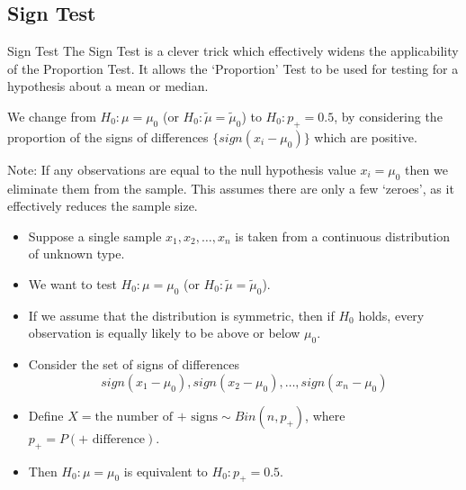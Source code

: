\documentclass[t,xcolor=pdftex,dvipsnames,table]{beamer}
\begin{document}
\subsection[Sign Test]{Sign Test}
\begin{frame}[fragile]{Sign Test}
The Sign Test is a clever trick which effectively widens the applicability of the Proportion Test. It allows the `Proportion' Test to be used for testing for a hypothesis about a mean or median.

\vspace{.5cm}
We change from $H_{0}: \mu = \mu_{0}$ (or $H_{0}: \tilde{\mu} = \tilde{\mu}_{0}$) to $H_{0}: p_{+} = 0.5$, by considering the proportion of the signs of differences $\{ sign(x_{i}-\mu_{0})\}$ which are positive.

\vspace{.5cm}
Note:
If any observations are equal to the null hypothesis value $x_{i} = \mu_{0}$ then we eliminate them from the sample. This assumes there are only a few `zeroes', as it effectively reduces the sample size.


\end{frame}  

\begin{frame}[fragile]{}
\begin{itemize}
\item 
Suppose a single sample $x_{1}, x_{2}, \ldots, x_{n}$ is taken from a continuous distribution of unknown type. 
\item We want to test $H_{0}: \mu = \mu_{0}$ (or $H_{0}: \tilde{\mu} = \tilde{\mu}_{0}$).
\item
If we assume that the distribution is symmetric, then if $H_{0}$ holds, every observation is equally likely to be above or below $\mu_{0}$. 

\item Consider the set of signs of differences 
\[ sign(x_{1}-\mu_{0}), sign(x_{2}-\mu_{0}), \ldots, sign(x_{n}-\mu_{0}) \]

\item Define $X = \mbox{the number of + signs} \sim Bin(n, p_{+})$, where
$p_{+} = P(+ \mbox{ difference})$.

\item Then $H_{0}: \mu = \mu_{0}$ is equivalent to $H_{0}: p_{+} = 0.5$. 
\end{itemize}
\end{frame}  
\end{document}
